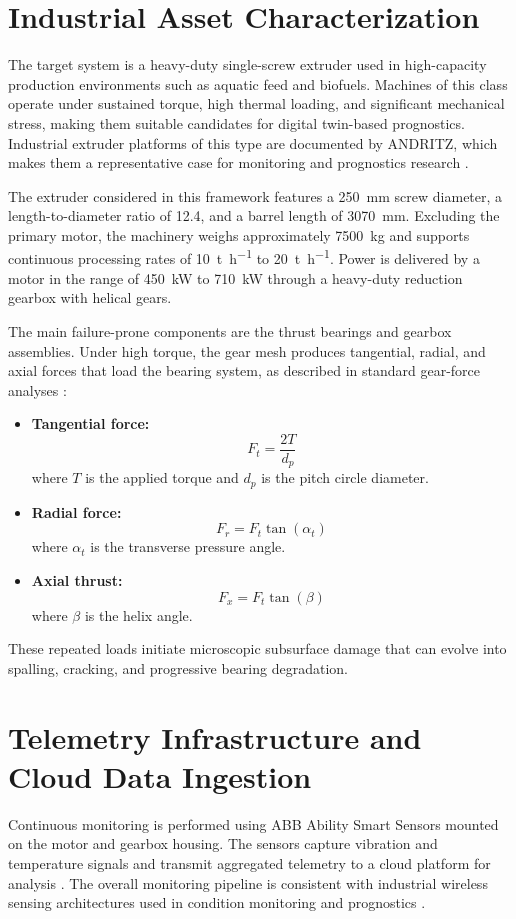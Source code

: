 \documentclass[journal,10pt,a4paper]{IEEEtran}
\begin{document}
\section{Industrial Asset Characterization}
The target system is a heavy-duty single-screw extruder used in high-capacity production environments such as aquatic feed and biofuels. Machines of this class operate under sustained torque, high thermal loading, and significant mechanical stress, making them suitable candidates for digital twin-based prognostics. Industrial extruder platforms of this type are documented by ANDRITZ, which makes them a representative case for monitoring and prognostics research \cite{andritz_extruder}.

The extruder considered in this framework features a \SI{250}{mm} screw diameter, a length-to-diameter ratio of 12.4, and a barrel length of \SI{3070}{mm}. Excluding the primary motor, the machinery weighs approximately \SI{7500}{kg} and supports continuous processing rates of \SI{10}{\tonne\per\hour} to \SI{20}{\tonne\per\hour}. Power is delivered by a motor in the range of \SI{450}{kW} to \SI{710}{kW} through a heavy-duty reduction gearbox with helical gears.

The main failure-prone components are the thrust bearings and gearbox assemblies. Under high torque, the gear mesh produces tangential, radial, and axial forces that load the bearing system, as described in standard gear-force analyses \cite{gear_forces,gear_forces_academic}:

\begin{itemize}[leftmargin=1.5em]
    \item \textbf{Tangential force:}
    \[
    F_t = \frac{2T}{d_p}
    \]
    where $T$ is the applied torque and $d_p$ is the pitch circle diameter.
    
    \item \textbf{Radial force:}
    \[
    F_r = F_t \tan(\alpha_t)
    \]
    where $\alpha_t$ is the transverse pressure angle.
    
    \item \textbf{Axial thrust:}
    \[
    F_x = F_t \tan(\beta)
    \]
    where $\beta$ is the helix angle.
\end{itemize}

These repeated loads initiate microscopic subsurface damage that can evolve into spalling, cracking, and progressive bearing degradation.

\section{Telemetry Infrastructure and Cloud Data Ingestion}
Continuous monitoring is performed using ABB Ability Smart Sensors mounted on the motor and gearbox housing. The sensors capture vibration and temperature signals and transmit aggregated telemetry to a cloud platform for analysis \cite{abbsmartsensor}. The overall monitoring pipeline is consistent with industrial wireless sensing architectures used in condition monitoring and prognostics \cite{abbsmartsensor,tao2018digitaltwin}.
\end{document}
